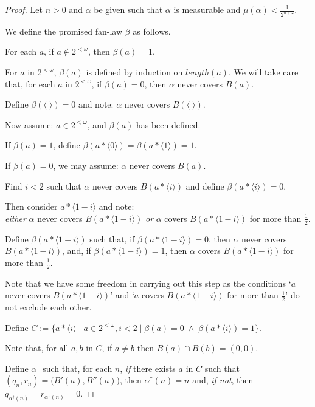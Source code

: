 \documentclass[a4paper]{amsart}
\theoremstyle{plain}
\begin{document}
 \begin{proof} Let $n>0$ and $ \alpha$ be given such that $\alpha$ is measurable and $\mu(\alpha)<\frac{1}{2^{n+2}}$.
 
 We define the promised fan-law $\beta$ as follows.
 
 
 For each $a$, if $a\notin 2^{<\omega}$, then $\beta(a)= 1$.
 
 For $a$ in $2^{<\omega}$,  $\beta(a)$ is defined by induction on $length(a)$. We will take care that, for each $a$ in $2^{<\omega}$, if $\beta(a) =0$, then $\alpha$ never covers $B(a)$. 
 
 
 
  Define $\beta(\langle\;\rangle)=0$ and note: $\alpha$ never covers $B(\langle\;\rangle)$.
  
   Now assume: $a\in 2^{<\omega}$, and $\beta(a)$ has been defined.
   
   If $\beta(a)=1$, define $\beta(a\ast \langle 0\rangle)= \beta(a\ast\langle 1 \rangle)=1$.
   
   If $\beta(a) = 0$, we may assume: $\alpha$ never covers $B(a)$. 
   
   Find $i<2$ such that $\alpha$ never covers $B(a\ast\langle i \rangle)$ and define $\beta(a\ast\langle i \rangle)=0$.
   
   Then consider $a\ast\langle 1-i\rangle$ and note: \\{\it either} $\alpha$ never covers $B(a\ast\langle 1-i\rangle)$ {\it or} $\alpha$ covers $B(a\ast\langle 1-i\rangle)$ for more than $\frac{1}{2}$. 
   
   Define $\beta(a\ast\langle 1-i\rangle)$ such that, if $\beta(a\ast \langle 1-i\rangle)=0$, then $\alpha$ never covers $B(a\ast\langle 1 -i\rangle)$, and, if $\beta(a\ast\langle 1 -i\rangle) =1$, then $\alpha$ covers $B(a\ast\langle 1 - i\rangle)$ for more than $\frac{1}{2}$. 
   
   Note that we have some freedom in carrying out this step as the conditions `$a$ never covers $B(a\ast\langle 1-i\rangle)$' and `$a$ covers $B(a\ast\langle 1-i\rangle)$ for more than $\frac{1}{2}$' do not exclude each other.
   
   Define $C:=\{a\ast\langle i\rangle \mid a\in 2^{<\omega}, i<2 \mid \beta(a)= 0 \;\wedge\; \beta(a\ast\langle i \rangle)=1\}$.
   
     Note that, for all $a,b$ in $C$, if  $a\neq b$ then $B(a)\cap B(b)=(0,0)$.
   
   Define $\alpha^\dag$ such that, for each $n$, {\it if} there exists    $a$ in $C$ such that  \\$(q_n, r_n)=\bigl(B'(a), B''(a)\bigr)$, then $\alpha^\dag(n)=n$ and, {\it if not}, then $q_{\alpha^\dag(n)} = r_{\alpha^\dag(n)}=0$.
   

\end{proof}
\end{document}
